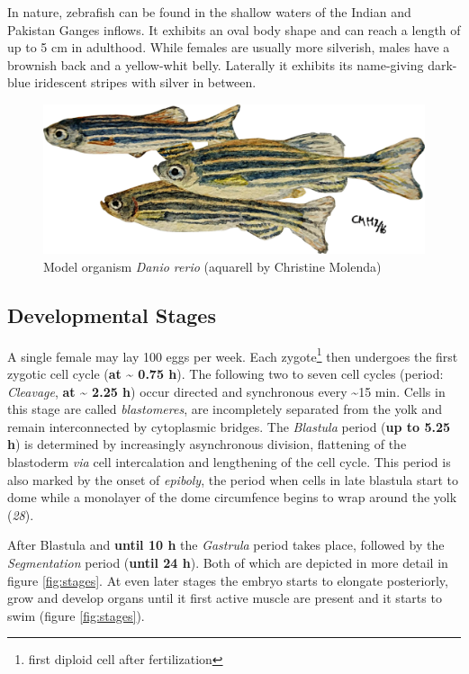 \documentclass[10pt, b5paper, singlespacinge, twoside]{reedthesis} %
\theoremstyle{definition}
\theoremstyle{definition}
\theoremstyle{definition}
\theoremstyle{remark}
\begin{document}
In nature, zebrafish can be found in the shallow waters of the Indian and Pakistan Ganges inflows. It exhibits an oval body shape and can reach a length of up to 5 cm in adulthood. While females are usually more silverish, males have a brownish back and a yellow-whit belly. Laterally it exhibits its name-giving dark-blue iridescent stripes with silver in between.


\begin{figure}

{\centering \includegraphics[width=0.5\linewidth]{figures/intro/CM_fish} 

}

\caption[Model organism Danio rerio]{Model organism \emph{Danio rerio} (aquarell by Christine Molenda)}\label{fig:zebra}
\end{figure}
\hypertarget{developmental-stages}{%
\subsection{Developmental Stages}\label{developmental-stages}}

A single female may lay 100 eggs per week. Each zygote\footnote{first diploid cell after fertilization} then undergoes the first zygotic cell cycle (\textbf{at \textasciitilde{} 0.75 h}). The following two to seven cell cycles (period: \emph{Cleavage}, \textbf{at \textasciitilde{} 2.25 h}) occur directed and synchronous every \textasciitilde15 min. Cells in this stage are called \emph{blastomeres}, are incompletely separated from the yolk and remain interconnected by cytoplasmic bridges. The \emph{Blastula} period (\textbf{up to 5.25 h}) is determined by increasingly asynchronous division, flattening of the blastoderm \emph{via} cell intercalation and lengthening of the cell cycle. This period is also marked by the onset of \emph{epiboly}, the period when cells in late blastula start to dome while a monolayer of the dome circumfence begins to wrap around the yolk (\emph{28}).

After Blastula and \textbf{until 10 h} the \emph{Gastrula} period takes place, followed by the \emph{Segmentation} period (\textbf{until 24 h}). Both of which are depicted in more detail in figure \ref{fig:stages}. At even later stages the embryo starts to elongate posteriorly, grow and develop organs until it first active muscle are present and it starts to swim (figure \ref{fig:stages}).
\end{document}
